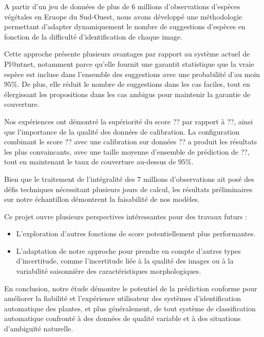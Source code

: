 \documentclass[a4paper,12pt]{article}
\begin{document}
\vspace{0.2cm}

A partir d'un jeu de données de plus de $6$ millions d'observations d'espèces végétales en Eruope du Sud-Ouest, nous avons développé une méthodologie permettant d'adapter dynamiquement le nombre de suggestions d'espèces en fonction de la difficulté d'identification de chaque image. 

\vspace{0.2cm}

Cette approche présente plusieurs avantages par rapport au système actuel de Pl@ntnet, notamment parce qu'elle fournit une garantit statistique que la vraie espèce est incluse dans l'ensemble des suggestions avec une probabilité d'au moin $95\%$. De plus, elle réduit le nombre de suggestions dans les cas faciles, tout en élergissant les propositions dans les cas ambigus pour maintenir la garantie de couverture.

\vspace{0.2cm}

Nos expériences ont démontré la supériorité du score ?? par rapport à ??, ainsi que l'importance de la qualité des données de calibration. La configuration combinant le score ?? avec une calibration sur données ?? a produit les résultats les plus convaincants, avec une taille moyenne d'ensemble de prédiction de ??, tout en maintenant le taux de couverture au-dessus de $95\%$.

\vspace{0.2cm}

Bien que le traitement de l'intégralité des $7$ millions d'observations ait posé des défis techniques nécessitant plusieurs jours de calcul, les résultats préliminaires sur notre échantillon démontrent la faisabilité de nos modèles.

\vspace{0.2cm}

Ce projet ouvre plusieurs perspectives intéressantes pour des travaux futurs :

\begin{itemize}
    \item L'exploration d'autres fonctions de score potentiellement plus performantes.
    \item L'adaptation de notre approche pour prendre en compte d'autres types d'incertitude, comme l'incertitude liée à la qualité des images ou à la variabilité saisonnière des caractéristiques morphologiques.
\end{itemize}

\vspace{0.2cm}

En conclusion, notre étude démontre le potentiel de la prédiction conforme pour améliorer la fiabilité et l'expérience utilisateur des systèmes d'identification automatique des plantes, et plus généralement, de tout système de classification automatique confronté à des données de qualité variable et à des situations d'ambiguïté naturelle.

\printbibliography
\end{document}
